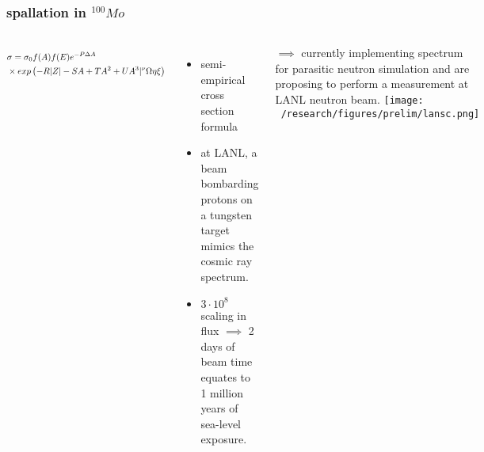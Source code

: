 \documentclass{beamer}
\begin{document}
	\begin{frame}
		\frametitle{spallation in $^{100}Mo$}
		\begin{columns}[c] %
			
			\begin{equation*}
			\resizebox{5cm}{!}{$
			\begin{split}
			& \sigma = \sigma_0 f(A)f(E)e^{-P\Delta A} \\
			& \times exp\left(-R|Z| -SA +TA^2 + UA^3|^{\nu} \Omega\eta\xi\right)
			\end{split}$}
			\end{equation*}
			
			\begin{itemize}
				\setlength\itemsep{2em}
				\item semi-empirical cross section formula
				\item at LANL, a beam bombarding protons on a tungsten target mimics the cosmic ray spectrum.
				\item $3\cdot 10^8 $ scaling in flux $\implies$ 2 days of beam time equates to 1 million years of sea-level exposure.
			\end{itemize}
			
			{\tiny $\implies$ currently implementing spectrum for parasitic neutron simulation and are proposing to perform a measurement at LANL neutron beam.}
			\hspace*{-0.4cm}\texttt{[image: ~/research/figures/prelim/lansc.png]}
			\begin{center}
			\end{center}
			
		\end{columns}
	\end{frame}
\end{document}
